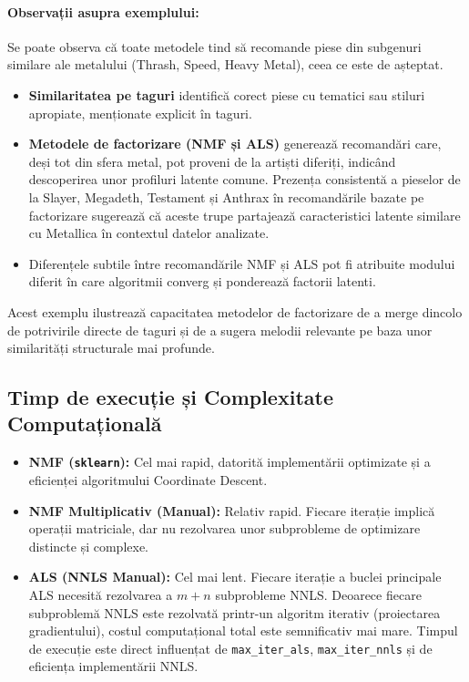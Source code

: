 \documentclass[12pt,a4paper]{article}
\begin{document}
	\paragraph{Observații asupra exemplului:}
	Se poate observa că toate metodele tind să recomande piese din subgenuri similare ale metalului (Thrash, Speed, Heavy Metal), ceea ce este de așteptat.
	\begin{itemize}
		\item \textbf{Similaritatea pe taguri} identifică corect piese cu tematici sau stiluri apropiate, menționate explicit în taguri.
		\item \textbf{Metodele de factorizare (NMF și ALS)} generează recomandări care, deși tot din sfera metal, pot proveni de la artiști diferiți, indicând descoperirea unor profiluri latente comune. Prezența consistentă a pieselor de la Slayer, Megadeth, Testament și Anthrax în recomandările bazate pe factorizare sugerează că aceste trupe partajează caracteristici latente similare cu Metallica în contextul datelor analizate.
		\item Diferențele subtile între recomandările NMF și ALS pot fi atribuite modului diferit în care algoritmii converg și ponderează factorii latenti.
	\end{itemize}
	Acest exemplu ilustrează capacitatea metodelor de factorizare de a merge dincolo de potrivirile directe de taguri și de a sugera melodii relevante pe baza unor similarități structurale mai profunde.
	
	\subsection{Timp de execuție și Complexitate Computațională} 
	\begin{itemize}
		\item \textbf{NMF (\texttt{sklearn}):} Cel mai rapid, datorită implementării optimizate și a eficienței algoritmului Coordinate Descent.
		\item \textbf{NMF Multiplicativ (Manual):} Relativ rapid. Fiecare iterație implică operații matriciale, dar nu rezolvarea unor subprobleme de optimizare distincte și complexe.
		\item \textbf{ALS (NNLS Manual):} Cel mai lent. Fiecare iterație a buclei principale ALS necesită rezolvarea a $m+n$ subprobleme NNLS. Deoarece fiecare subproblemă NNLS este rezolvată printr-un algoritm iterativ (proiectarea gradientului), costul computațional total este semnificativ mai mare. Timpul de execuție este direct influențat de \texttt{max\_iter\_als}, \texttt{max\_iter\_nnls} și de eficiența implementării NNLS.
	\end{itemize}
	
\end{document}

